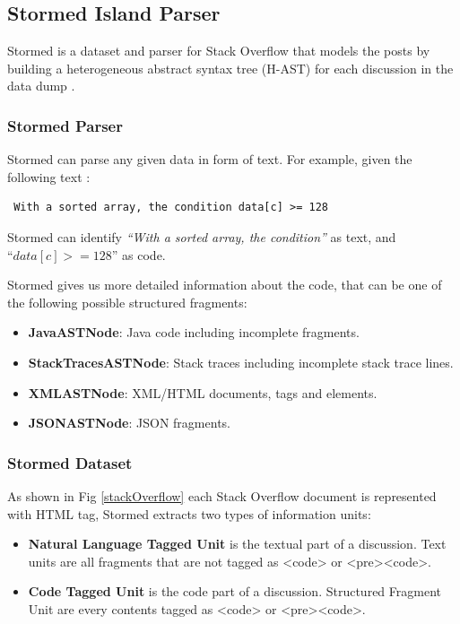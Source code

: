 \documentclass[12pt,mscthesis]{usiinfthesis}
\begin{document}
	\subsection{Stormed Island Parser}
	
	 Stormed is a dataset and parser for Stack Overflow that models the posts by building a heterogeneous abstract syntax tree (H-AST) for each discussion in the data dump \cite{Ponz2015a}.
	 \subsubsection{Stormed Parser}
	 Stormed can parse any given data in form of text. For example, given the following text : 
	 \begin{verbatim} With a sorted array, the condition data[c] >= 128  \end{verbatim} 
	 Stormed can identify  \emph{``With a sorted array, the condition''} as text, and \\``$data[c] >= 128$'' as code. 


	 Stormed gives us more detailed information about the code, that can be one of the following possible structured fragments:
	 \begin{itemize}
	 \item \textbf{JavaASTNode}: Java code including incomplete fragments.
	 \item \textbf{StackTracesASTNode}: Stack traces including incomplete stack trace lines.
	 \item \textbf{XMLASTNode}: XML/HTML documents, tags and elements.
	 \item \textbf{JSONASTNode}: JSON fragments.
	 \end{itemize}

	 \subsubsection{Stormed Dataset}

	  As shown in Fig \ref{stackOverflow} each Stack Overflow document is represented with HTML tag, Stormed extracts two types of information units:
	 	 \begin{itemize}
		\item \textbf{Natural Language Tagged Unit} is the textual part of a discussion. Text units are all fragments that are not tagged as <code> or <pre><code>.	
		\item \textbf{Code Tagged Unit} is the code part of a discussion. Structured Fragment Unit are every contents tagged as <code> or <pre><code>.
	 \end{itemize}
\end{document}

